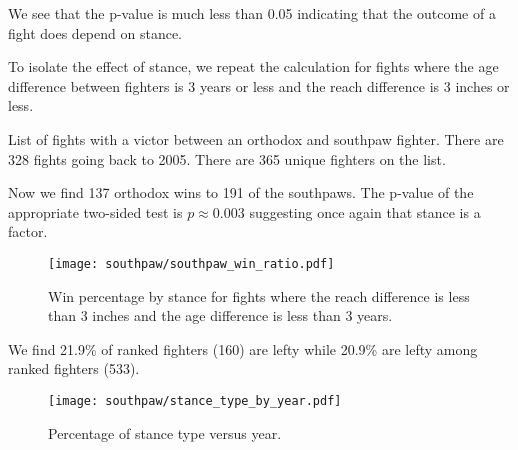 We see that the p-value is much less than 0.05 indicating that the outcome of a fight does depend on stance.

To isolate the effect of stance, we repeat the calculation for fights where the age difference between fighters
is 3 years or less and the reach difference is 3 inches or less. 

\begin{center}
\begin{table}[h]

\caption{List of fights with a victor between an orthodox and southpaw fighter. There are 328 fights going back to 2005. There are 365 unique fighters on the list.}
\end{table}
\end{center}

Now we find 137 orthodox wins to 191 of the southpaws. The p-value of the
appropriate two-sided test is $p \approx 0.003$ suggesting once again
that stance is a factor.

\begin{figure}[h]
\begin{center}
\texttt{[image: southpaw/southpaw\_win\_ratio.pdf]}
\caption{Win percentage by stance for fights where the reach difference
is less than 3 inches and the age difference is less than 3 years.}
\end{center}
\end{figure}

We find 21.9\% of ranked fighters (160) are lefty while 20.9\% are lefty among ranked fighters (533).

\begin{figure}[h]
\begin{center}
\texttt{[image: southpaw/stance\_type\_by\_year.pdf]}
\caption{Percentage of stance type versus year.}
\end{center}
\end{figure}
